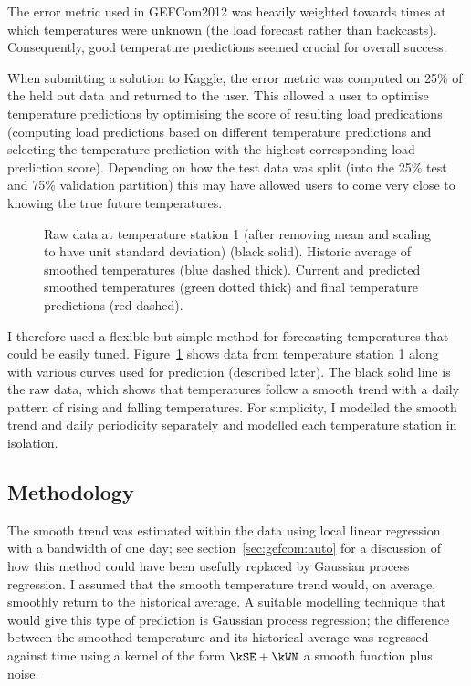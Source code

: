 The error metric used in GEFCom2012 was heavily weighted towards times at which temperatures were unknown (\ie the load forecast rather than backcasts).
Consequently, good temperature predictions seemed crucial for overall success.

When submitting a solution to Kaggle, the error metric was computed on 25\% of the held out data and returned to the user.
This allowed a user to optimise temperature predictions by optimising the score of resulting load predications (\ie computing load predictions based on different temperature predictions and selecting the temperature prediction with the highest corresponding load prediction score).
Depending on how the test data was split (into the 25\% test and 75\% validation partition) this may have allowed users to come very close to knowing the true future temperatures.

\begin{figure}[ht]
  \begin{center}
    
  \end{center}
  \caption[Modelling of temperature data.]{Raw data at temperature station 1 (after removing mean and scaling to have unit standard deviation) (black solid). Historic average of smoothed temperatures (blue dashed thick). Current and predicted smoothed temperatures (green dotted thick) and final temperature predictions (red dashed).}
  \label{fig:temp_pred}
\end{figure}

I therefore used a flexible but simple method for forecasting temperatures that could be easily tuned.
Figure~\ref{fig:temp_pred} shows data from temperature station 1 along with various curves used for prediction (described later).
The black solid line is the raw data, which shows that temperatures follow a smooth trend with a daily pattern of rising and falling temperatures.
For simplicity, I modelled the smooth trend and daily periodicity separately and modelled each temperature station in isolation.

\subsection{Methodology}

The smooth trend was estimated within the data using local linear regression \citep[e.g. chapter 6 of][]{Hastie2009-hj} with a bandwidth of one day; see section~\ref{sec:gefcom:auto} for a discussion of how this method could have been usefully replaced by Gaussian process regression.
I assumed that the smooth temperature trend would, on average, smoothly return to the historical average.
A suitable modelling technique that would give this type of prediction is Gaussian process regression; the difference between the smoothed temperature and its historical average was regressed against time using a kernel of the form $\kSE + \kWN$ \ie a smooth function plus noise.

